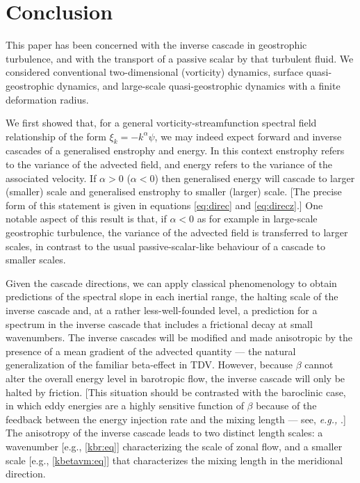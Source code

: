 \documentclass{jfm}
\newcommand{\eg}  {\textit{e.g., }}
\begin{document}
\section{Conclusion}
\label{disc:sec}

This paper has been concerned with the inverse cascade in geostrophic
turbulence, and with the transport of a passive scalar by that
turbulent fluid. We considered conventional two-dimensional (vorticity)
dynamics, surface quasi-geostrophic dynamics, and large-scale
quasi-geostrophic dynamics with a finite deformation radius.

We first showed that, for a general vorticity-streamfunction spectral
field relationship of the form $\xi_k = - k^\alpha \psi$, we may
indeed expect forward and inverse cascades of a generalised enstrophy
and energy. In this context enstrophy refers to the variance of the
advected field, and energy refers to the variance of the associated
velocity. If $\alpha > 0$ ($\alpha < 0$) then generalised energy will
cascade to larger (smaller) scale and generalised enstrophy to smaller
(larger) scale.  [The precise form of this statement is given in
equations \eqref{eq:direc} and \eqref{eq:direcz}.] One notable aspect
of this result is that, if $\alpha < 0$ as for example in large-scale
geostrophic turbulence, the variance of the advected field is
transferred to larger scales, in contrast to the usual
passive-scalar-like behaviour of a cascade to smaller scales.

Given the cascade directions, we can apply classical phenomenology to
obtain predictions of the spectral slope in each inertial range, the
halting scale of the inverse cascade and, at a rather
less-well-founded level, a prediction for a spectrum in the inverse
cascade that includes a frictional decay at small wavenumbers. The
inverse cascades will be modified and made anisotropic by the presence
of a mean gradient of the advected quantity --- the natural
generalization of the familiar beta-effect in TDV. However, because
$\beta$ cannot alter the overall energy level in barotropic flow, the
inverse cascade will only be halted by friction.  [This situation
should be contrasted with the baroclinic case, in which eddy energies
are a highly sensitive function of $\beta$ because of the feedback
between the energy injection rate and the mixing length --- see, \eg
\cite{Held96}.] The anisotropy of the inverse cascade leads to two
distinct length scales: a wavenumber [e.g., \eqref{kbr:eq}]
characterizing the scale of zonal flow, and a smaller scale [e.g.,
\eqref{kbetavm:eq}] that characterizes the mixing length in the
meridional direction.
\end{document}
